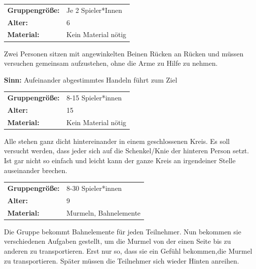 \begin{table}[H]
\begin{tabular}{>{\bfseries}lp{8cm}}
   Gruppengröße:   & Je 2 Spieler*Innen\\
    Alter: & 6 \\
    Material: & Kein Material nötig \\ 
\end{tabular}
\end{table} 

Zwei Personen sitzen mit angewinkelten Beinen Rücken an Rücken und müssen versuchen gemeinsam aufzustehen, ohne die Arme zu Hilfe zu nehmen.

\textbf{Sinn:} Aufeinander abgestimmtes Handeln führt zum Ziel


\begin{table}[H]
\begin{tabular}{>{\bfseries}lp{8cm}}
   Gruppengröße:   & 8-15 Spieler*innen\\
    Alter: & 15 \\
    Material: & Kein Material nötig \\ 
\end{tabular}
\end{table} 

Alle stehen ganz dicht hintereinander in einem geschlossenen Kreis. Es soll versucht werden, dass jeder sich auf die Schenkel/Knie der hinteren Person setzt. Ist gar nicht so einfach und leicht kann der ganze Kreis an irgendeiner Stelle auseinander brechen.

\begin{table}[H]
\begin{tabular}{>{\bfseries}lp{8cm}}
   Gruppengröße:   & 8-30 Spieler*innen\\
    Alter: & 9 \\
    Material: & Murmeln, Bahnelemente \\ 
\end{tabular}
\end{table} 
Die Gruppe bekommt Bahnelemente für jeden Teilnehmer. Nun bekommen sie verschiedenen Aufgaben gestellt, um die Murmel von der einen Seite bis zu anderen zu transportieren.  Erst nur so, dass sie ein Gefühl bekommen,die Murmel zu transportieren. Später müssen die Teilnehmer sich wieder Hinten anreihen.

